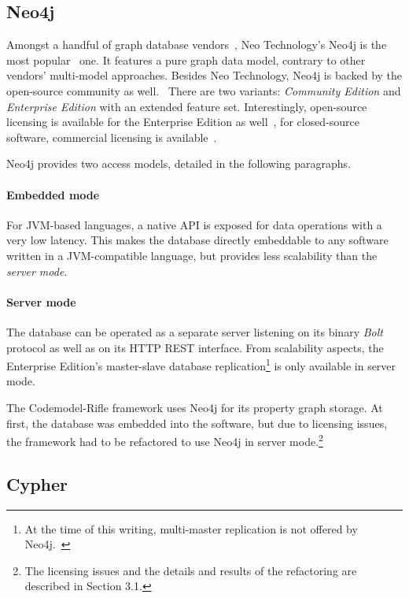 \subsection{Neo4j}

Amongst a handful of graph database vendors~\cite{graph-dbs}, Neo Technology's Neo4j is the most popular~\cite{graph-dbs-raking} one. It features a pure graph data model, contrary to other vendors' multi-model approaches. Besides Neo Technology, Neo4j is backed by the open-source community as well.~\cite{neo4j-github} There are two variants: \emph{Community Edition} and \emph{Enterprise Edition} with an extended feature set. Interestingly, open-source licensing is available for the Enterprise Edition as well~\cite{neo4j-opensource}, for closed-source software, commercial licensing is available~\cite{neo4j-licensing}.

Neo4j provides two access models, detailed in the following paragraphs.

\paragraph{Embedded mode} For JVM-based languages, a native API is exposed for data operations with a very low latency. This makes the database directly embeddable to any software written in a JVM-compatible language, but provides less scalability than the \emph{server mode}.

\paragraph{Server mode} The database can be operated as a separate server listening on its binary \emph{Bolt} protocol as well as on its HTTP REST interface. From scalability aspects, the Enterprise Edition's master-slave database replication\footnote{At the time of this writing, multi-master replication is not offered by Neo4j.~\cite{neo4j-clustering-architecture}} is only available in server mode.

The Codemodel-Rifle framework uses Neo4j for its property graph storage. At first, the database was embedded into the software, but due to licensing issues, the framework had to be refactored to use Neo4j in server mode.\footnote{The licensing issues and the details and results of the refactoring are described in Section 3.1.}

\subsection{Cypher}

